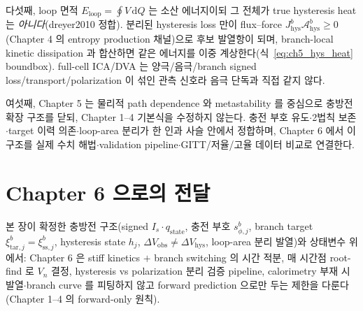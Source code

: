 \documentclass[11pt,a4paper]{article}
\newcommand{\dd}{\mathrm{d}}
\newcommand{\hys}{\mathrm{hys}}
\newcommand{\obs}{\mathrm{obs}}
\newcommand{\tar}{\mathrm{tar}}
\newcommand{\stt}{\mathrm{state}}
\newcommand{\sstat}{\mathrm{ss}}
\begin{document}
다섯째, loop 면적 $E_{\mathrm{loop}}=\oint V\,\dd Q$ 는 소산 에너지이되 그 전체가 true hysteresis heat 는
\emph{아니다}(dreyer2010 정합). 분리된 hysteresis loss 만이 flux--force $J_\hys^b\mathcal A_\hys^b\ge0$
(Chapter 4 의 entropy production 채널)으로 후보 발열항이 되며, branch-local kinetic dissipation 과 합산하면
같은 에너지를 이중 계상한다(식~\eqref{eq:ch5_hys_heat} boundbox). full-cell ICA/DVA 는 양극/음극/branch signed
loss/transport/polarization 이 섞인 관측 신호라 음극 단독과 직접 같지 않다.

여섯째, Chapter 5 는 물리적 path dependence 와 metastability 를 중심으로 충방전 확장 구조를 닫되, Chapter 1--4
기본식을 수정하지 않는다. 충전 부호 유도$\cdot$2법칙 보존$\cdot$target 이력 의존$\cdot$loop-area 분리가 한 인과
사슬 안에서 정합하며, Chapter 6 에서 이 구조를 실제 수치 해법$\cdot$validation pipeline$\cdot$GITT/저율/고율
데이터 비교로 연결한다.

\section*{Chapter 6 으로의 전달}
본 장이 확정한 충방전 구조(signed $I_s\cdot q_\stt$, 충전 부호 $s_{\phi,j}^b$, branch target $\xi_{\tar,j}^b
=\xi_{\sstat,j}^b$, hysteresis state $h_j$, $\Delta V_\obs\ne\Delta V_\hys$, loop-area 분리 발열)와 상태변수
위에서: Chapter 6 은 stiff kinetics $+$ branch switching 의 시간 적분, 매 시간점 root-find 로 $V_n$ 결정,
hysteresis vs polarization 분리 검증 pipeline, calorimetry 부재 시 발열$\cdot$branch curve 를 피팅하지 않고
forward prediction 으로만 두는 제한을 다룬다(Chapter 1--4 의 forward-only 원칙).
\end{document}
